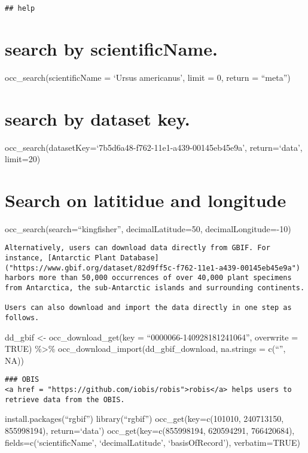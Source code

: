 \documentclass[]{article}
\begin{document}
\begin{verbatim}
## help
\end{verbatim}

\section{search by scientificName.}\label{search-by-scientificname.}

occ\_search(scientificName = `Ursus americanus', limit = 0, return =
``meta'')

\section{search by dataset key.}\label{search-by-dataset-key.}

occ\_search(datasetKey=`7b5d6a48-f762-11e1-a439-00145eb45e9a',
return=`data', limit=20)

\section{Search on latitidue and
longitude}\label{search-on-latitidue-and-longitude}

occ\_search(search=``kingfisher'', decimalLatitude=50,
decimalLongitude=-10)

\begin{verbatim}
Alternatively, users can download data directly from GBIF. For instance, [Antarctic Plant Database]("https://www.gbif.org/dataset/82d9ff5c-f762-11e1-a439-00145eb45e9a") harbors more than 50,000 occurrences of over 40,000 plant specimens from Antarctica, the sub-Antarctic islands and surrounding continents. 

Users can also download and import the data directly in one step as follows.
\end{verbatim}

dd\_gbif \textless{}- occ\_download\_get(key =
``0000066-140928181241064'', overwrite = TRUE) \%\textgreater{}\%
occ\_download\_import(dd\_gbif\_download, na.strings = c(``'', NA))

\begin{verbatim}
### OBIS
<a href = "https://github.com/iobis/robis">robis</a> helps users to retrieve data from the OBIS.
\end{verbatim}

install.packages(``rgbif'') library(``rgbif'') occ\_get(key=c(101010,
240713150, 855998194), return=`data') occ\_get(key=c(855998194,
620594291, 766420684), fields=c(`scientificName', `decimalLatitude',
`basisOfRecord'), verbatim=TRUE)
\end{document}
